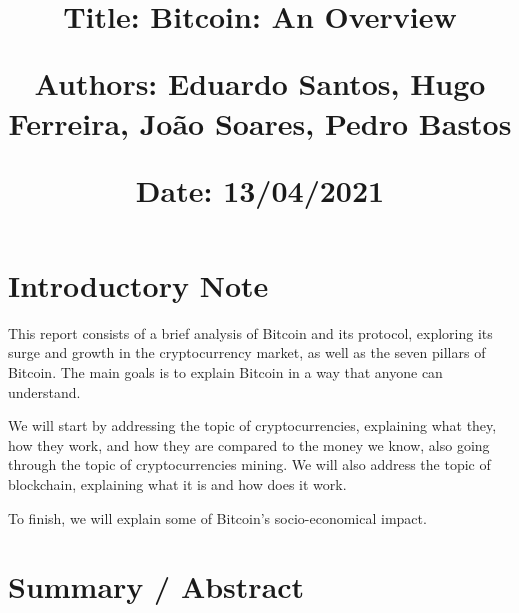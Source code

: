 \documentclass{article}
\newcommand\tab[1][1cm]{\hspace*{#1}}
\begin{document}
\title{\vspace{-0.9cm}
       \vspace{1cm}
       \normalsize
       \raggedright\textbf{Title: \hspace{1.5cm} Bitcoin: An Overview} \\ \vspace{0.4cm}
       \raggedright\textbf{Authors: \hspace{0.95cm} Eduardo Santos, Hugo Ferreira, João Soares, Pedro Bastos} \\ \vspace{0.4cm}
       \raggedright\textbf{Date: \hspace{1.45cm} 13/04/2021} \\}
\author{}
\date{}

\maketitle
\thispagestyle{fancy}


\vspace{-1.4cm}

\tableofcontents


\fontsize{10pt}{13pt}
\selectfont
\lsstyle


\newpage

\section{Introductory Note}

\tab This report consists of a brief analysis of Bitcoin and its protocol, exploring its surge and growth in the cryptocurrency market, as well as the seven pillars of Bitcoin. The main goals is to explain Bitcoin in a way that anyone can understand.

We will start by addressing the topic of cryptocurrencies, explaining what they, how they work, and how they are compared to the money we know, also going through the topic of cryptocurrencies mining.
We will also address the topic of blockchain, explaining what it is and how does it work.

To finish, we will explain some of Bitcoin's socio-economical impact.

\section{Summary / Abstract}
\end{document}
